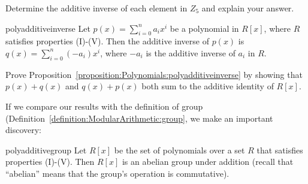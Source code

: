 \begin{exercise}{}
Determine the additive inverse of each element in $Z_5$ and explain your answer.
\end{exercise}


\begin{prop}{polyadditiveinverse} Let $p(x)=\sum_{i=0}^n a_i x^i$ be a polynomial in $R[x]$, where $R$ satisfies properties (I)-(V). Then the additive inverse of $p(x)$ is $q(x)=\sum_{i=0}^n (-a_i) x^i$, where $-a_i$ is the additive inverse of $a_i$ in $R$.
\end{prop}

\begin{exercise}{}
Prove Proposition~\ref{proposition:Polynomials:polyadditiveinverse} by showing that $p(x) + q(x)$ and $q(x)+ p(x)$ both sum to the additive identity of $R[x]$.
\end{exercise}

%

If we compare our results with the definition of group (Definition~\ref{definition:ModularArithmetic:group}, we make an important discovery: 

\begin{prop}{polyadditivegroup} Let $R[x]$ be the  set of polynomials over a set $R$ that satisfies properties (I)-(V). Then $R[x]$ is an abelian group under addition (recall that ``abelian'' means that the group's operation is commutative). 
\end{prop}

